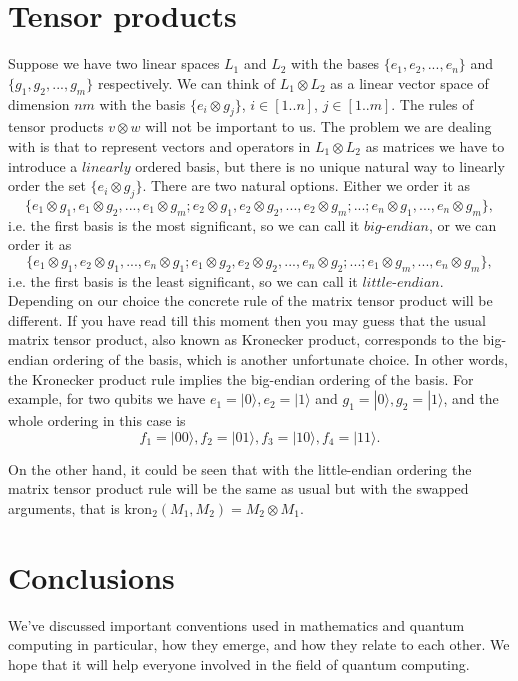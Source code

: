 \documentclass{article}
\begin{document}
\section{Tensor products}

Suppose we have two linear spaces $L_1$ and $L_2$ with the bases $\{e_1, e_2, ... , e_n\}$ and $\{g_1, g_2, ... , g_m\}$ respectively.
We can think of $L_1 \otimes L_2$ as a linear vector space of dimension $nm$ with 
the basis $\{ e_i \otimes g_j \}$, $i \in [1..n]$, $j \in [1..m]$. 
The rules of tensor products $v \otimes w$ will not be important to us. 
The problem we are dealing with is that to represent vectors and operators in $L_1 \otimes L_2$ as matrices 
we have to introduce a $\textit{linearly}$ ordered basis, 
but there is no unique natural way to linearly order the set $\{ e_i \otimes g_j \}$. 
There are two natural options. 
Either we order it as 
$$\{ e_1 \otimes g_1, e_1 \otimes g_2, ..., e_1 \otimes g_m; e_2 \otimes g_1, e_2 \otimes g_2, ..., e_2 \otimes g_m; ... ; e_n \otimes g_1, ..., e_n \otimes g_m  \},$$ 
i.e. the first basis is the most significant, so we can call it $\textit{big-endian}$, 
or we can order it as 
$$\{ e_1 \otimes g_1, e_2 \otimes g_1, ..., e_n \otimes g_1; e_1 \otimes g_2, e_2 \otimes g_2, ..., e_n \otimes g_2; ... ; e_1 \otimes g_m, ..., e_n \otimes g_m  \},$$
i.e. the first basis is the least significant, so we can call it $\textit{little-endian}$. 
Depending on our choice the concrete rule of the matrix tensor product will be different. 
If you have read till this moment then you may guess that the usual matrix tensor product, also known as Kronecker product, 
corresponds to the big-endian ordering of the basis, which is another unfortunate choice. 
In other words, the Kronecker product rule implies the big-endian ordering of the basis. 
For example, for two qubits we have $e_1 = |0\rangle, e_2 = |1\rangle$ and $g_1 = |0\rangle, g_2 = |1\rangle$, 
and the whole ordering in this case is 
$$ f_1 = |00\rangle, f_2 = |01\rangle, f_3 = |10\rangle, f_4 = |11\rangle.$$

On the other hand, it could be seen that with the little-endian ordering the matrix tensor product rule will be the same as usual but with the swapped arguments, 
that is $\textrm{kron}_2(M_1, M_2) = M_2 \otimes M_1$.



\section{Conclusions}
We've discussed important conventions used in mathematics and quantum computing in particular, 
how they emerge, and how they relate to each other. 
We hope that it will help everyone involved in the field of quantum computing. 


% 
\end{document}
